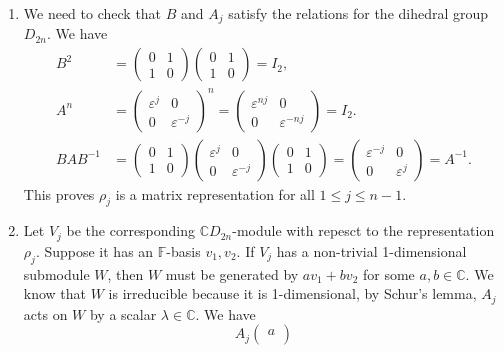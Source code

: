 \documentclass[a4paper, 12pt]{article}
\begin{document}
\begin{solution}
\begin{enumerate}[(1)]
\item We need to check that \(B\) and \(A_j\) satisfy the relations for the dihedral group \(D_{2n}\). We have 
\begin{align*}
B^2&=\begin{pmatrix}
	0&1\\ 
	1&0
\end{pmatrix}\begin{pmatrix}
	0&1\\ 
	1&0
\end{pmatrix}=I_2,\\ 
A^n&=\begin{pmatrix}
	\varepsilon^j&0\\ 
	0&\varepsilon^{-j}
\end{pmatrix}^n=\begin{pmatrix}
	\varepsilon^{nj}&0\\ 
	0&\varepsilon^{-nj}
\end{pmatrix}=I_2.\\ 
BAB^{-1}&=\begin{pmatrix}
	0&1\\ 
	1&0
\end{pmatrix}\begin{pmatrix}
	\varepsilon^j&0\\ 
	0&\varepsilon^{-j}
\end{pmatrix}\begin{pmatrix}
	0&1\\ 
	1&0
\end{pmatrix}=\begin{pmatrix}
	\varepsilon^{-j}&0\\ 
	0&\varepsilon^j
\end{pmatrix}=A^{-1}.
\end{align*}
This proves \(\rho_j\) is a matrix representation for all \(1\leq j\leq n-1\).
\item Let \(V_j\) be the corresponding \(\mathbb{C}D_{2n}\)-module with repesct to the representation \(\rho_j\). Suppose it has an \(\mathbb{F}\)-basis \(v_1,v_2\). If \(V_j\) has a non-trivial 1-dimensional submodule \(W\), then \(W\) must be generated by 
\(av_1+bv_2\) for some \(a,b\in \mathbb{C}\). We know that \(W\) is irreducible because it is 1-dimensional, by Schur's lemma, \(A_j\) acts on \(W\) by a scalar \(\lambda\in \mathbb{C}\). We have 
\[A_j\begin{pmatrix}
	a\\ 

\end{pmatrix}\]
\end{enumerate}
\end{solution}
\end{document}

